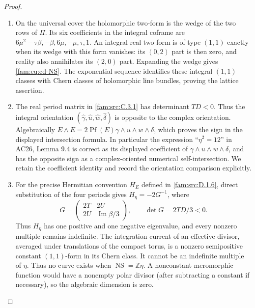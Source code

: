 \begin{proof}
\begin{enumerate}[label=\arabic*.,leftmargin=*]
\item On the universal cover the holomorphic two-form is the wedge of the two
rows of \(\Pi\). Its six coefficients in the integral coframe are
\(6\mu^2-\tau\beta,-\beta,6\mu,-\mu,\tau,1\).
An integral real two-form is of type \((1,1)\) exactly when its wedge
with this form vanishes: its \((0,2)\) part is then zero, and reality
also annihilates its \((2,0)\) part. Expanding the wedge gives
\eqref{fam:eq:cd-NS}. The exponential sequence identifies these integral
\((1,1)\) classes with Chern classes of holomorphic line bundles, proving
the lattice assertion.

\item The real period matrix in \ref{fam:src:C.3.1} has determinant \(TD<0\). Thus the
integral orientation \((\widehat\gamma,\widehat u,\widehat w,
\widehat\delta)\) is opposite to the complex orientation. Algebraically
\(E\wedge E=2\operatorname{Pf}(E)\gamma\wedge u\wedge w\wedge\delta\),
which proves the sign in the displayed intersection formula. In
particular the expression ``\(\eta^2=12\)'' in AC26, Lemma 9.4 is correct
as its displayed coefficient of \(\gamma\wedge u\wedge w\wedge\delta\),
and has the opposite sign as a complex-oriented numerical
self-intersection. We retain the coefficient identity and record the
orientation comparison explicitly.

\item For the precise Hermitian convention $H_E$ defined in \ref{fam:src:D.1.6}, direct
substitution of the four periods gives $H_\eta=-2G^{-1}$, where
\[
 G=\begin{pmatrix}2T&2U\\2U&\operatorname{Im}\beta/3\end{pmatrix},
 \qquad \det G=2TD/3<0.
\]
Thus $H_\eta$ has one positive and one negative eigenvalue, and every
nonzero multiple remains indefinite. The integration
current of an effective divisor, averaged under translations of the
compact torus, is a nonzero semipositive constant \((1,1)\)-form in its
Chern class. It cannot be an indefinite multiple of \(\eta\).
Thus no curve exists when \(\operatorname{NS}=\mathbb Z\eta\).
A nonconstant meromorphic function would have a nonempty polar divisor
(after subtracting a constant if necessary), so the algebraic dimension
is zero.
\end{enumerate}
\end{proof}

